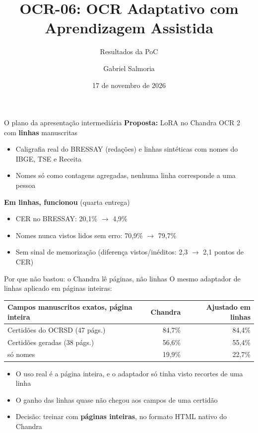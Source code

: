 \documentclass[aspectratio=169,11pt]{beamer}
\title{OCR-06: OCR Adaptativo com Aprendizagem Assistida}
\subtitle{Resultados da PoC}
\author{Gabriel Salmoria \quad {\small Tutor: Lucas Mayr}}
\institute{INE5448 -- IA e Segurança -- UFSC}
\date{17 de novembro de 2026}
\begin{document}
\maketitle

\begin{frame}{O plano da apresentação intermediária}
\textbf{Proposta:} LoRA no Chandra OCR 2 com \textbf{linhas} manuscritas
\begin{itemize}
  \item Caligrafia real do BRESSAY (redações) e linhas sintéticas com nomes do IBGE, TSE e Receita
  \item Nomes só como contagens agregadas, nenhuma linha corresponde a uma pessoa
\end{itemize}
\vspace{0.6em}
\textbf{Em linhas, funcionou} (quarta entrega)
\begin{itemize}
  \item CER no BRESSAY: 20,1\% $\rightarrow$ 4,9\%
  \item Nomes nunca vistos lidos sem erro: 70,9\% $\rightarrow$ 79,7\%
  \item Sem sinal de memorização (diferença vistos/inéditos: 2,3 $\rightarrow$ 2,1 pontos de CER)
\end{itemize}
\end{frame}

\begin{frame}{Por que não bastou: o Chandra lê páginas, não linhas}
\small
O mesmo adaptador de linhas aplicado em páginas inteiras:
\vspace{0.4em}

\centering
\begin{tabular}{@{}lrr@{}}
\toprule
Campos manuscritos exatos, página inteira & Chandra & Ajustado em linhas \\
\midrule
Certidões do OCRSD (47 págs.) & 84,7\% & 84,4\% \\
Certidões geradas (38 págs.) & 56,6\% & 55,4\% \\
\quad só nomes & 19,9\% & 22,7\% \\
\bottomrule
\end{tabular}

\vspace{0.6em}
\raggedright
\begin{itemize}
  \item O uso real é a página inteira, e o adaptador só tinha visto recortes de uma linha
  \item O ganho das linhas quase não chegou aos campos de uma certidão
  \item Decisão: treinar com \textbf{páginas inteiras}, no formato HTML nativo do Chandra
\end{itemize}
\end{frame}
\end{document}
